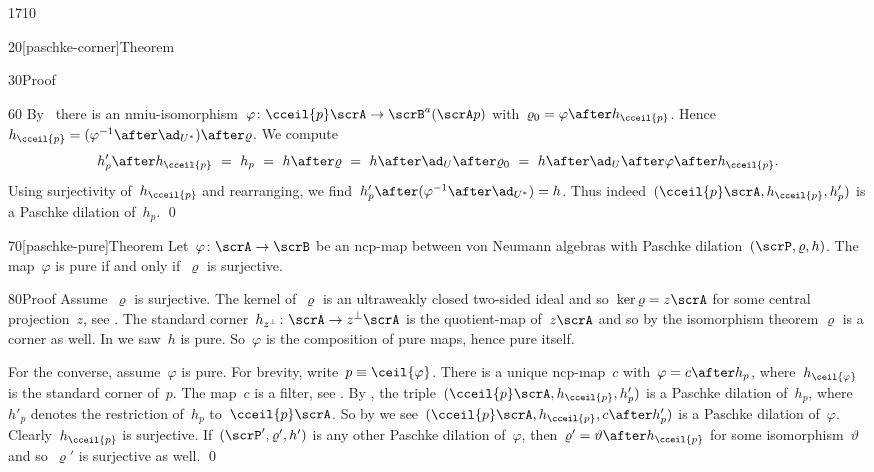 \begin{parsec}{1710}
\begin{point}{20}[paschke-corner]{Theorem}
\begin{point}{30}{Proof}
\begin{point}{60}
    By~
    there is an nmiu-isomorphism~$\varphi\colon
    \cceil{p} \scrA \to \scrB^a(\scrA p)$
    with~$\varrho_0 = \varphi \after h_{\cceil{p}}$.
Hence~$h_{\cceil{p}} = (\varphi^{-1} \after \ad_{U^*}) \after \varrho$.
We compute
\begin{equation*}
h'_p \after h_{\cceil{p}}
    \ = \ h_p
    \ =\  h \after \varrho
    \ =\ h \after \ad_U \after \varrho_0
    \ = \ h \after \ad_U \after \varphi \after h_{\cceil{p}}.
\end{equation*}
Using surjectivity of~$h_{\cceil{p}}$
and rearranging, we find~$h'_p \after (\varphi^{-1} \after \ad_{U^*}) = h$.
Thus indeed~$(\cceil{p} \scrA, h_{\cceil{p}}, h'_p)$
is a Paschke dilation of~$h_p$.  \qed
\end{point}
\end{point}
\end{point}
\begin{point}{70}[paschke-pure]{Theorem}%
    Let~$\varphi\colon \scrA \to \scrB$ be an ncp-map
    between von Neumann algebras with
    Paschke dilation~$(\scrP, \varrho, h)$.
The map~$\varphi$ is pure if and only if~$\varrho$ is surjective.
\begin{point}{80}{Proof}%
Assume~$\varrho$ is surjective.
The kernel of~$\varrho$ is an ultraweakly closed
two-sided ideal and so~$\ker\varrho = z \scrA$ for some central projection~$z$,
see .
The standard corner~$h_{z^\perp} \colon \scrA \to z^\perp \scrA$
    is the quotient-map of~$z \scrA$
    and so by the isomorphism theorem $\varrho$ is a corner as well.
In  we saw~$h$ is pure.
So~$\varphi$ is the composition of pure maps, hence pure itself.

For the converse, assume~$\varphi$ is pure.
For brevity, write~$p \equiv \ceil{\varphi}$.
There is a unique ncp-map~$c$ with~$\varphi = c \after h_p$,
    where~$h_{\ceil{\varphi}}$ is the standard corner of~$p$.
The map~$c$ is a filter,
    see .
By ,
    the triple~$(\cceil{p}\scrA, h_{\cceil{p}}, h'_p)$
    is a Paschke dilation of~$h_p$,
    where~$h'_p$ denotes the restriction of~$h_p$ to~$\cceil{p} \scrA$.
So by 
    we see~$(\cceil{p}\scrA, h_{\cceil{p}}, c\after h'_p)$
    is a Paschke dilation of~$ \varphi$.
Clearly~$h_{\cceil{p}}$ is surjective.
If~$(\scrP', \varrho', h')$ is any other Paschke dilation of~$\varphi$,
    then~$\varrho' = \vartheta \after h_{\cceil{p}}$
    for some isomorphism~$\vartheta$
    and so~$\varrho'$ is surjective as well. \qed
\end{point}
\end{point}
\end{parsec}

